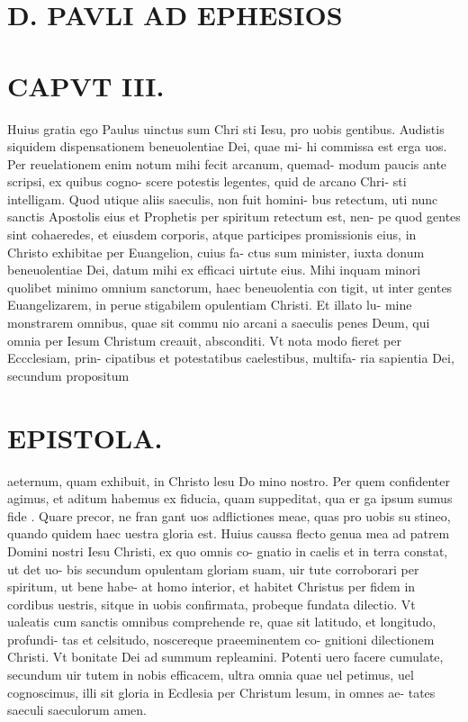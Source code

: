 \documentclass{article}
\begin{document}
\begin{pages}
\section*{D. PAVLI AD EPHESIOS }
\marginpar{[ p.1. ]}
\marginpar{[ p.2. ]}
\marginpar{[ p.3. ]}
\marginpar{[ p.4.  ]}
\endnumbering\beginnumbering\section{CAPVT III. }\pstart Huius gratia ego Paulus uinctus sum Chri sti Iesu, pro uobis gentibus.  Audistis siquidem dispensationem beneuolentiae Dei, quae mi- hi commissa est erga uos. Per reuelationem enim notum mihi fecit arcanum, quemad- modum paucis ante scripsi, ex quibus  cogno- scere potestis legentes, quid de arcano Chri- sti intelligam.  \pend\pstart Quod utique  aliis saeculis, non fuit homini- bus retectum, uti nunc sanctis Apostolis eius et Prophetis per spiritum retectum est, nen- pe quod gentes sint cohaeredes, et eiusdem corporis, atque participes promissionis eius, in Christo exhibitae per Euangelion, cuius fa- ctus sum minister, iuxta donum beneuolentiae Dei, datum mihi ex efficaci uirtute eius.  \pend\pstart Mihi inquam minori quolibet minimo omnium sanctorum, haec beneuolentia con tigit, ut inter gentes Euangelizarem, in perue stigabilem opulentiam Christi. Et illato lu- mine monstrarem omnibus, quae sit commu nio arcani a saeculis penes Deum, qui omnia per Iesum Christum creauit, absconditi.  \pend\pstart Vt nota modo fieret per Eccclesiam, prin- cipatibus et potestatibus caelestibus, multifa- ria sapientia Dei, secundum propositum  \pend
\section*{EPISTOLA.  }
\marginpar{[ p.12 ]}
\marginpar{[ p.5.  ]}
\marginpar{[ p.6.  ]}
\marginpar{[ p.7. ]}
\marginpar{[ p.8. ]}
\marginpar{[ p.9. ]}\pstart aeternum, quam exhibuit, in Christo lesu Do mino nostro.  \pend\pstart Per quem confidenter agimus, et aditum habemus ex fiducia, quam suppeditat, qua er ga ipsum sumus fide . Quare precor, ne fran gant uos adflictiones meae, quas pro uobis su stineo, quando quidem haec uestra gloria est.  \pend\pstart Huius caussa flecto genua mea ad patrem Domini nostri Iesu Christi, ex quo omnis co- gnatio in caelis et in terra constat, ut det uo- bis secundum opulentam gloriam suam, uir tute corroborari per spiritum, ut bene habe- at homo interior, et habitet Christus per fidem in cordibus uestris, sitque  in uobis confirmata, probeque  fundata dilectio.  \pend\pstart Vt ualeatis cum sanctis omnibus comprehende re, quae sit latitudo, et longitudo, profundi- tas et celsitudo, noscereque  praeeminentem co- gnitioni dilectionem Christi. Vt bonitate Dei ad summum repleamini.  \pend\pstart Potenti uero facere cumulate, secundum uir tutem in nobis efficacem, ultra omnia quae uel petimus, uel cognoscimus, illi sit gloria in Ecdlesia per Christum lesum, in omnes ae- tates saeculi saeculorum amen.  \pend

\end{pages}
\end{document}
